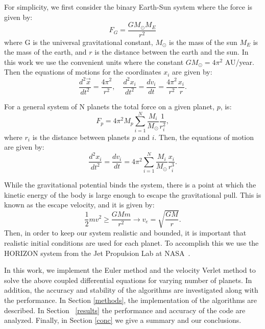 \documentclass[prc,amsmath,twocolumn,superscriptaddress]{revtex4}
\begin{document}
For simplicity, we first consider the binary Earth-Sun system where the force is given by:
\begin{equation}
F_G=\frac{GM_\odot M_E}{r^2}
\end{equation}
where G is the universal gravitational constant, $M_\odot$ is the mass of the sun $M_E$ is the mass of the earth, and $r$ is the distance between the earth and the sun. In this work we use the convenient units where the constant $GM_\odot =4\pi^2$ AU/year. Then the equations of motions for the coordinates $x_i$ are given by:
\begin{equation}
\frac{d^2\vec{x}}{dt^2} = \frac{4\pi^2}{r^2} ,\quad \frac{d^2x_i}{dt^2}=\frac{dv_i}{dt}=\frac{4\pi^2}{r^2}\frac{x_i}{r}.
\end{equation}

For a general system of N planets the total force on a given planet, $p$, is:
\begin{equation}
F_p=4\pi^2M_p\sum_{i=1}^N \frac{M_i}{M_\odot}\frac{1}{r_i^2},
\end{equation}
where $r_i$ is the distance between planets $p$ and $i$. Then, the equations of motion are given by:
\begin{equation}
\frac{d^2x_i}{dt^2}=\frac{dv_i}{dt}=4\pi^2\sum_{i=1}^N \frac{M_i}{M_\odot}\frac{x_i}{r_i^3}.
\end{equation}


While the gravitational potential binds the system, there is a point at which the kinetic energy of the body is large enough to escape the gravitational pull. This is known as the escape velocity, and it is given by:
\begin{equation}
\frac{1}{2}mv^2\geq \frac{GMm}{r^2} \rightarrow v_{e}=\sqrt{\frac{GM}{r}}.
\end{equation}
Then, in order to keep our system realistic and bounded, it is important that realistic initial conditions are used for each planet. To accomplish this we use the HORIZON system from the Jet Propulsion Lab at NASA~\cite{horizon}.

In this work, we implement the Euler method and the velocity Verlet method to solve the above coupled differential equations for varying number of planets. In addition, the accuracy and stability of the algorithms are investigated along with the performance. In Section \ref{methods}, the implementation of the algorithms are described. In Section ~\ref{results} the performance and accuracy of the code are analyzed. Finally, in Section \ref{conc} we give a summary and our conclusions.
\end{document}
